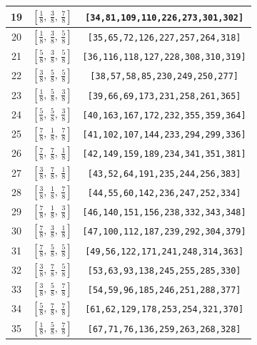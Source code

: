 \documentclass[fleqn,8pt]{jsarticle}
\begin{document}
\begin{longtable}{ccc}
19 & $\left[ \frac{1}{8},\, \frac{3}{8},\, \frac{7}{8} \right]$ & {\tt [34,81,109,110,226,273,301,302]} \\ \hline
20 & $\left[ \frac{1}{8},\, \frac{3}{8},\, \frac{5}{8} \right]$ & {\tt [35,65,72,126,227,257,264,318]} \\ \hline
21 & $\left[ \frac{5}{8},\, \frac{3}{8},\, \frac{5}{8} \right]$ & {\tt [36,116,118,127,228,308,310,319]} \\ \hline
22 & $\left[ \frac{3}{8},\, \frac{5}{8},\, \frac{5}{8} \right]$ & {\tt [38,57,58,85,230,249,250,277]} \\ \hline
23 & $\left[ \frac{1}{8},\, \frac{5}{8},\, \frac{3}{8} \right]$ & {\tt [39,66,69,173,231,258,261,365]} \\ \hline
24 & $\left[ \frac{5}{8},\, \frac{5}{8},\, \frac{3}{8} \right]$ & {\tt [40,163,167,172,232,355,359,364]} \\ \hline
25 & $\left[ \frac{7}{8},\, \frac{1}{8},\, \frac{7}{8} \right]$ & {\tt [41,102,107,144,233,294,299,336]} \\ \hline
26 & $\left[ \frac{7}{8},\, \frac{7}{8},\, \frac{1}{8} \right]$ & {\tt [42,149,159,189,234,341,351,381]} \\ \hline
27 & $\left[ \frac{3}{8},\, \frac{7}{8},\, \frac{1}{8} \right]$ & {\tt [43,52,64,191,235,244,256,383]} \\ \hline
28 & $\left[ \frac{3}{8},\, \frac{1}{8},\, \frac{7}{8} \right]$ & {\tt [44,55,60,142,236,247,252,334]} \\ \hline
29 & $\left[ \frac{7}{8},\, \frac{1}{8},\, \frac{3}{8} \right]$ & {\tt [46,140,151,156,238,332,343,348]} \\ \hline
30 & $\left[ \frac{7}{8},\, \frac{3}{8},\, \frac{1}{8} \right]$ & {\tt [47,100,112,187,239,292,304,379]} \\ \hline
31 & $\left[ \frac{7}{8},\, \frac{5}{8},\, \frac{5}{8} \right]$ & {\tt [49,56,122,171,241,248,314,363]} \\ \hline
32 & $\left[ \frac{3}{8},\, \frac{7}{8},\, \frac{5}{8} \right]$ & {\tt [53,63,93,138,245,255,285,330]} \\ \hline
33 & $\left[ \frac{3}{8},\, \frac{5}{8},\, \frac{7}{8} \right]$ & {\tt [54,59,96,185,246,251,288,377]} \\ \hline
34 & $\left[ \frac{5}{8},\, \frac{7}{8},\, \frac{7}{8} \right]$ & {\tt [61,62,129,178,253,254,321,370]} \\ \hline
35 & $\left[ \frac{1}{8},\, \frac{5}{8},\, \frac{7}{8} \right]$ & {\tt [67,71,76,136,259,263,268,328]} \\ \hline

\end{longtable}
\end{document}
